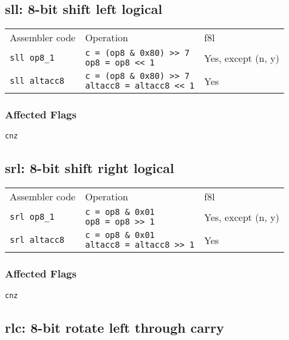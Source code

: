\documentclass{book}
\begin{document}
\subsection{sll: 8-bit shift left logical}

\begin{tabular}{l l l}
Assembler code       & Operation                                                                   & f8l \\
\texttt{sll op8\_1}  & \makecell{\texttt{c = (op8 \& 0x80) >> 7}\\\texttt{op8 = op8 << 1}}         & Yes, except (n, y) \\
\texttt{sll altacc8} & \makecell{\texttt{c = (op8 \& 0x80) >> 7}\\\texttt{altacc8 = altacc8 << 1}} & Yes
\end{tabular}

\subsubsection*{Affected Flags}

\texttt{cnz}


\subsection{srl: 8-bit shift right logical}

\begin{tabular}{l l l}
Assembler code       & Operation                                                            & f8l \\
\texttt{srl op8\_1}  & \makecell{\texttt{c = op8 \& 0x01}\\\texttt{op8 = op8 >> 1}}         & Yes, except (n, y) \\
\texttt{srl altacc8} & \makecell{\texttt{c = op8 \& 0x01}\\\texttt{altacc8 = altacc8 >> 1}} & Yes
\end{tabular}

\subsubsection*{Affected Flags}

\texttt{cnz}


\subsection{rlc: 8-bit rotate left through carry}
\end{document}
